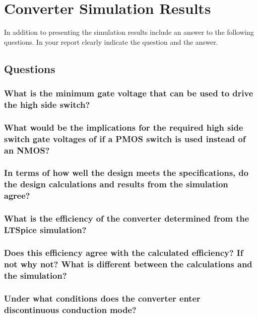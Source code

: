 \section{Converter Simulation Results}


In addition to presenting the simulation results include an answer to the following questions. In your report clearly indicate the question and the answer.

\subsection{Questions}
\subsubsection{What is the minimum gate voltage that can be used to drive the high side switch?}
\subsubsection{What would be the implications for the required high side switch gate voltages of if a PMOS switch is used instead of an NMOS?}
\subsubsection{In terms of how well the design meets the specifications, do the design calculations and results from the simulation agree?}

\subsubsection{What is the efficiency of the converter determined from the LTSpice simulation?}

\subsubsection{Does this efficiency agree with the calculated efficiency? If not why not? What is different between the calculations and the simulation?}

\subsubsection{Under what conditions does the converter enter discontinuous conduction mode?}


